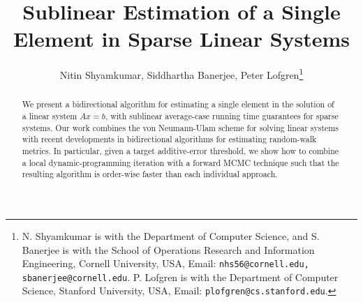 \documentclass[letterpaper,conference]{ieeeconf}
\begin{document}


\title{Sublinear Estimation of a Single Element in Sparse Linear Systems}


\author{Nitin Shyamkumar, Siddhartha Banerjee, Peter Lofgren\thanks{N. Shyamkumar is with the Department of Computer Science, and S. Banerjee is with the School of Operations Research and Information Engineering, Cornell University, USA, Email: {\tt nhs56@cornell.edu, sbanerjee@cornell.edu}. P. Lofgren is with the Department of Computer Science, Stanford University, USA, Email: {\tt plofgren@cs.stanford.edu}.}}

\maketitle

\begin{abstract}
We present a bidirectional algorithm for estimating a single element in the solution of a linear system $Ax=b$, with sublinear average-case running time guarantees for sparse systems.
Our work combines the von Neumann-Ulam scheme for solving linear systems with recent developments in bidirectional
algorithms for estimating random-walk metrics. 
In particular, given a target additive-error threshold, we show how to combine a local dynamic-programming iteration with a forward MCMC technique such that the resulting algorithm is order-wise faster than each individual
approach.      
\end{abstract}








 
\end{document}
